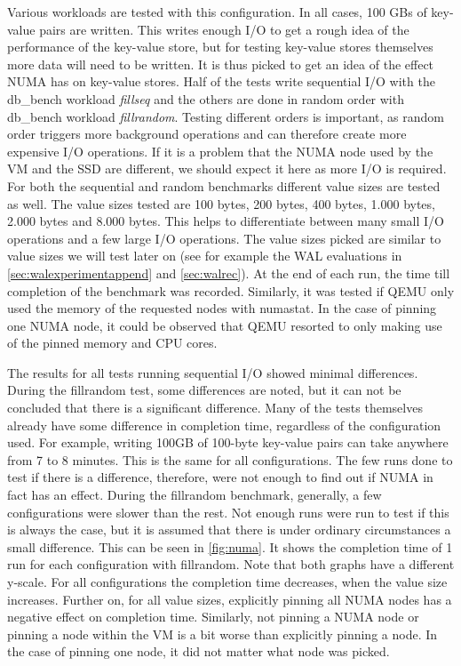 Various workloads are tested with this configuration. In all cases, 100 GBs of key-value pairs are written. This writes enough I/O to get a rough idea of the performance of the key-value store, but for testing key-value stores themselves more data will need to be written. It is thus picked to get an idea of the effect NUMA has on key-value stores.  Half of the tests write sequential I/O with the db\_bench workload \textit{fillseq} and the others are done in random order with db\_bench workload \textit{fillrandom}. Testing different orders is important, as random order triggers more background operations and can therefore create more expensive I/O operations. If it is a problem that the NUMA node used by the VM and the SSD are different, we should expect it here as more I/O is required. For both the sequential and random benchmarks different value sizes are tested as well. The value sizes tested are 100 bytes, 200 bytes, 400 bytes, 1.000 bytes, 2.000 bytes and 8.000 bytes. This helps to differentiate between many small I/O operations and a few large I/O operations. The value sizes picked are similar to value sizes we will test later on (see for example the WAL evaluations in \autoref{sec:walexperimentappend} and \autoref{sec:walrec}).  At the end of each run, the time till completion of the benchmark was recorded. Similarly, it was tested if QEMU only used the memory of the requested nodes with numastat. In the case of pinning one NUMA node, it could be observed that QEMU resorted to only making use of the pinned memory and CPU cores. 

The results for all tests running sequential I/O showed minimal differences. During the fillrandom test, some differences are noted, but it can not be concluded that there is a significant difference. Many of the tests themselves already have some difference in completion time, regardless of the configuration used. For example, writing 100GB of 100-byte key-value pairs can take anywhere from 7 to 8 minutes. This is the same for all configurations. The few runs done to test if there is a difference, therefore, were not enough to find out if NUMA in fact has an effect. During the fillrandom benchmark, generally, a few configurations were slower than the rest. Not enough runs were run to test if this is always the case, but it is assumed that there is under ordinary circumstances a small difference. This can be seen in \autoref{fig:numa}. It shows the completion time of 1 run for each configuration with fillrandom. Note that both graphs have a different y-scale.  For all configurations the completion time decreases, when the value size increases. Further on, for all value sizes, explicitly pinning all NUMA nodes has a negative effect on completion time. Similarly, not pinning a NUMA node or pinning a node within the VM is a bit worse than explicitly pinning a node. In the case of pinning one node, it did not matter what node was picked.  

